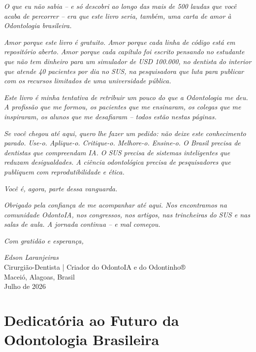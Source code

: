 \textit{O que eu não sabia -- e só descobri ao longo das mais de 500 laudas que
você acaba de percorrer -- era que este livro seria, também, uma carta de amor
à Odontologia brasileira.}

\textit{Amor porque este livro é gratuito. Amor porque cada linha de código está
em repositório aberto. Amor porque cada capítulo foi escrito pensando no
estudante que não tem dinheiro para um simulador de USD 100.000, no dentista
do interior que atende 40 pacientes por dia no SUS, na pesquisadora que luta
para publicar com os recursos limitados de uma universidade pública.}

\textit{Este livro é minha tentativa de retribuir um pouco do que a Odontologia
me deu. A profissão que me formou, os pacientes que me ensinaram, os colegas
que me inspiraram, os alunos que me desafiaram -- todos estão nestas páginas.}

\textit{Se você chegou até aqui, quero lhe fazer um pedido: não deixe este
conhecimento parado. Use-o. Aplique-o. Critique-o. Melhore-o. Ensine-o.
O Brasil precisa de dentistas que compreendam IA. O SUS precisa de sistemas
inteligentes que reduzam desigualdades. A ciência odontológica precisa de
pesquisadores que publiquem com reprodutibilidade e ética.}

\textit{Você é, agora, parte dessa vanguarda.}

\textit{Obrigado pela confiança de me acompanhar até aqui. Nos encontramos na
comunidade OdontoIA, nos congressos, nos artigos, nas trincheiras do SUS e nas
salas de aula. A jornada continua -- e mal começou.}

\begin{flushright}
\textit{Com gratidão e esperança,}

\textit{Edson Laranjeiras} \\
Cirurgião-Dentista | Criador do OdontoIA e do Odontinho® \\
Maceió, Alagoas, Brasil \\
Julho de 2026
\end{flushright}

\section{Dedicatória ao Futuro da Odontologia Brasileira}
\label{sec:dedicatoria-futuro}

